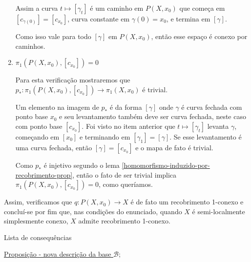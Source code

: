 \begin{dem}
\begin{enumerate}
            Assim a curva $t\mapsto [\gamma_t]$ é um caminho em $P(X,x_0)$ que começa em $[c_{\gamma(0)}]=[c_{x_0}]$, curva constante em $\gamma(0)=x_0$, e termina em $[\gamma]$.

            Como isso vale para todo $[\gamma]$ em $P(X, x_0)$, então esse espaço é conexo por caminhos.\newline
        
        \item $\pi_1(P(X,x_0), [c_{x_0}])=0$\newline
        
            Para esta verificação mostraremos que $p_*: \pi_1(P(X,x_0), [c_{x_0}])\rightarrow \pi_1(X,x_0)$ é trivial.\newline

            Um elemento na imagem de $p_*$ é da forma $[\gamma]$ onde $\gamma$ é curva fechada com ponto base $x_0$ e seu levantamento também deve ser curva fechada, neste caso com ponto base $[c_{x_0}]$. Foi visto no item anterior que $t\mapsto [\gamma_t]$ levanta $\gamma$, começando em $[x_0]$ e terminando em $[\gamma_1]=[\gamma]$. Se esse levantamento é uma curva fechada, então $[\gamma]=[c_{x_0}]$ e o mapa de fato é trivial.

            Como $p_*$ é injetivo segundo o lema \ref{homomorfismo-induzido-por-recobrimento-prop}, então o fato de ser trivial implica $\pi_1(P(X,x_0), [c_{x_0}])=0$, como queríamos.\newline
        
    \end{enumerate}

    Assim, verificamos que $q: P(X,x_0)\rightarrow X$ é de fato um recobrimento 1-conexo e concluí-se por fim que, nas condições do enunciado, quando $X$ é semi-localmente simplesmente conexo, $X$ admite recobrimento 1-conexo.
    
\end{dem}

\begin{titlemize}{Lista de consequências}
	\item \hyperref[pertence-a-base-se-e-somente-se-possui-i-trivial]{Proposição - nova descrição da base $\mathcal{B}$};\\ %
\end{titlemize}